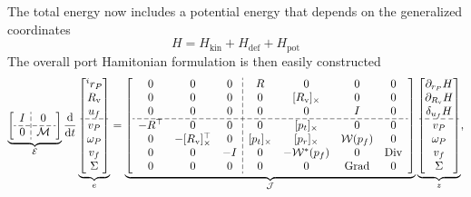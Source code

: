 The total energy now includes a potential energy that depends on the generalized coordinates
\begin{equation*}
H = H_{\text{kin}} + H_{\text{def}} + H_{\text{pot}}
\end{equation*}
The overall port Hamitonian formulation is then easily constructed 
\begin{equation}
\label{eq:ph_mfd_all}
\setlength{\dashlinegap}{2pt}
\underbrace{
	{\left[ \begin{array}{c:c}
		I & 0 \\
		\hdashline
		0 & \mathcal{M} \\
		\end{array} \right]}
}_{\mathcal{E}}
\diff{}{t}
\underbrace{\begin{bmatrix}
^i r_P \\ R_{\text{v}} \\ u_f \\\hdashline  v_P \\ \omega_P  \\ v_f  \\ \Sigma \\
\end{bmatrix}}_{e} = 
\underbrace{
	{\left[ \begin{array}{ccc:cccc}
		0 & 0 & 0 & R & 0 & 0 & 0 \\
		0 & 0 & 0 & 0 & \crmat{R_{\text{v}}} & 0 & 0 \\
		0 & 0 & 0 & 0 & 0 & I & 0 \\ 
		\hdashline 
		-R^\top & 0 & 0 & 0 & \crmat{p_t} & 0 & 0 \\
		0 & -\crmat{R_{\text{v}}}^\top & 0 & \crmat{p_t} & \crmat{p_r} & \mathcal{W}(p_f) & 0 \\
		0 & 0 & -I & 0 & -\mathcal{W}^*(p_f) & 0 & \Div \\
		0 & 0 & 0 & 0 & 0 & \Grad & 0 \\
		\end{array} \right]}
	}_{\mathcal{J}}
\underbrace{\begin{bmatrix}
\partial_{r_P}H \\ \partial_{R_\text{v}}H \\ \delta_{u_f} H \\\hdashline  v_P \\ \omega_P  \\ v_f  \\ \Sigma \\
\end{bmatrix}}_{z},
\end{equation} 
